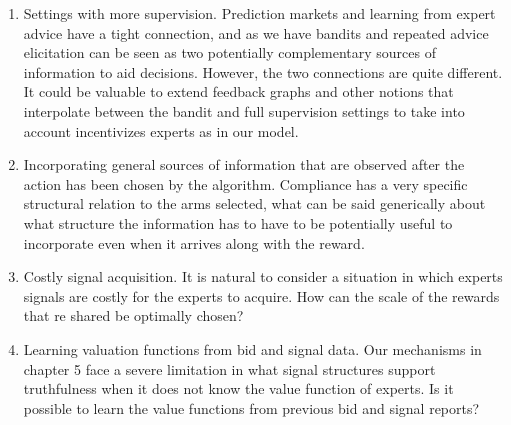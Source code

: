 \begin{enumerate}

\item Settings with more supervision. Prediction markets and learning from expert advice have a tight connection, and as we have bandits and repeated advice elicitation can be seen as two potentially complementary sources of information to aid decisions. However, the two connections are quite different. It could be valuable to extend feedback graphs and other notions that interpolate between the bandit and full supervision settings to take into account incentivizes experts as in our model. 

\item Incorporating general sources of information that are observed after the action has been chosen by the algorithm. Compliance has a very specific structural relation to the arms selected, what can be said generically about what structure the information has to have to be potentially useful to incorporate even when it arrives along with the reward.

\item Costly signal acquisition. It is natural to consider a situation in which experts signals are costly for the experts to acquire. How can the scale of the rewards that re shared be optimally chosen?

\item Learning valuation functions from bid and signal data. Our mechanisms in chapter 5 face a severe limitation in what signal structures support truthfulness when it does not know the value function of experts. Is it possible to learn the value functions from previous bid and signal reports?

\end{enumerate}





